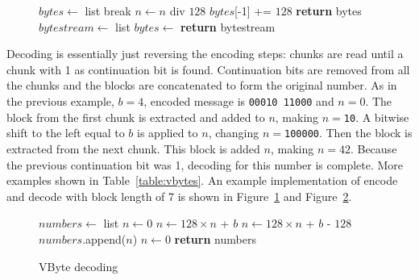 \begin{figure}[ht]
\centering
  \begin{minipage}{0.5\linewidth}
\begin{algorithmic}[H]
\State $bytes\gets $ list
\State {}
 \State break \EndIf
\State $n\gets n$ div $128$
\EndWhile
\State $bytes$[-1] += $128$
\State \textbf{return} bytes
\EndFunction
\medskip
\medskip
{}
\State $bytestream\gets $ list
\State $bytes \gets$ 
\State {}
\EndFor
\State \textbf{return} bytestream
\EndFunction

\end{algorithmic}
\end{minipage}
 \label{vbyte_enc}
\end{figure}

Decoding is essentially just reversing the encoding steps: chunks are read until a chunk with 1 as continuation bit is found. Continuation bits 
are removed from all the chunks and the blocks are concatenated to form the original number. As in the previous example, $b = 4$, encoded message 
is \texttt{00010 11000} and $n = 0$. The block from the first chunk is extracted and added to $n$, making $n = $\texttt{10}. A bitwise shift to the left 
equal to $b$ is applied to $n$, changing $n = $\texttt{100000}. Then the block is extracted from the next chunk. This block is added  $n$, making 
$n = 42$. Because the previous continuation bit was 1, decoding for this number is complete. More examples shown in Table~\ref{table:vbytes}. 
An example implementation of encode and decode with block length of 7 is shown in Figure~\ref{vbyte_enc} and Figure~\ref{vbyte_dec}.

\begin{figure}[ht]
\centering
  \begin{minipage}{0.5\linewidth}
\begin{algorithmic}[H]
\State $numbers\gets $ list
\State $n\gets 0$
\State $n\gets 128\times n $ + $b$
\Else
\State $n\gets 128\times n $ + $b$ - $128$
\State $numbers$.append($n$)
\State $n\gets 0$
\EndIf
\EndFor
\State \textbf{return} numbers
\EndFunction
\end{algorithmic}
\end{minipage}
\caption{VByte decoding} \label{vbyte_dec}
\end{figure}

